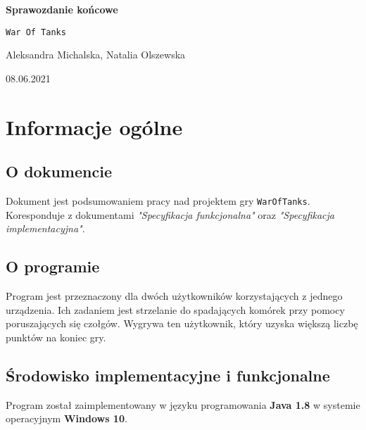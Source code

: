 \documentclass[a4paper]{article}
\begin{document}
\begin{titlepage}
	\begin{center}
		\vspace*{5cm}

	        \Huge
        	\textbf{Sprawozdanie ko\'ncowe}

        	\vspace{1cm}
	        \Huge
        	\texttt{War Of Tanks}

    		\vspace{1.5cm}

	        \large
		    Aleksandra Michalska, Natalia Olszewska

        	\vfill

	        \vspace{3cm}

		\large 08.06.2021
	\end{center}
\end{titlepage}

\tableofcontents

\newpage


\section{Informacje og\'olne}

\subsection{O dokumencie}
\quad Dokument jest podsumowaniem pracy nad projektem gry \texttt{WarOfTanks}. 
Koresponduje z dokumentami \textit{"Specyfikacja funkcjonalna"} oraz \textit{"Specyfikacja implementacyjna"}.

\subsection{O programie}
\quad Program jest przeznaczony dla dw\'och u\.zytkownik\'ow korzystaj\k{a}cych z jednego urz\k{a}dzenia. Ich zadaniem jest strzelanie do spadaj\k{a}cych kom\'orek przy pomocy poruszaj\k{a}cych si\k{e} czo\l{}g\'ow.
Wygrywa ten u\.zytkownik, kt\'ory uzyska wi\k{e}ksz\k{a} liczb\k{e} punkt\'ow na koniec gry.

\subsection{\'Srodowisko implementacyjne i funkcjonalne}
\quad Program zosta\l{} zaimplementowany w j\k{e}zyku programowania \textbf{Java 1.8} w systemie operacyjnym \textbf{Windows 10}. 
\end{document}
